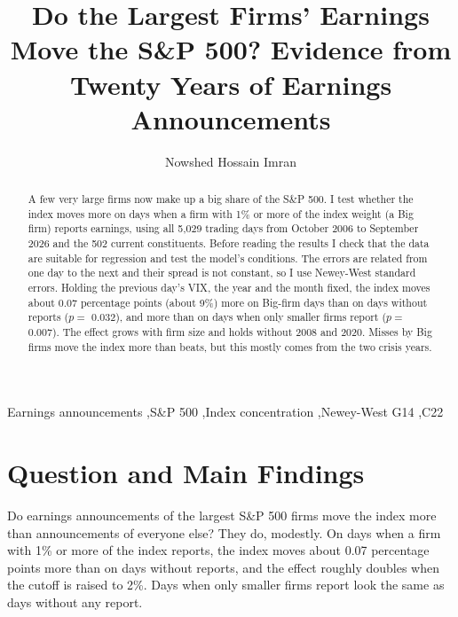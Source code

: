 \documentclass[preprint,letterpaper,11pt,authoryear]{elsarticle}
\begin{document}
\renewcommand{\topfraction}{0.9}
\renewcommand{\textfraction}{0.1}
\renewcommand{\floatpagefraction}{0.8}

\begin{frontmatter}

\title{Do the Largest Firms' Earnings Move the S\&P 500? Evidence from Twenty Years of Earnings Announcements}

\author{Nowshed Hossain Imran}

\begin{abstract}
A few very large firms now make up a big share of the S\&P 500. I test whether the index moves more on days when a firm with 1\% or more of the index weight (a Big firm) reports earnings, using all 5,029 trading days from October 2006 to September 2026 and the 502 current constituents. Before reading the results I check that the data are suitable for regression and test the model's conditions. The errors are related from one day to the next and their spread is not constant, so I use Newey-West standard errors. Holding the previous day's VIX, the year and the month fixed, the index moves about 0.07 percentage points (about 9\%) more on Big-firm days than on days without reports ($p =$ 0.032), and more than on days when only smaller firms report ($p =$ 0.007). The effect grows with firm size and holds without 2008 and 2020. Misses by Big firms move the index more than beats, but this mostly comes from the two crisis years.
\end{abstract}

\begin{keyword}
Earnings announcements \sep S\&P 500 \sep Index concentration \sep Newey-West
\JEL G14 \sep C22
\end{keyword}

\end{frontmatter}

\section{Question and Main Findings}

Do earnings announcements of the largest S\&P 500 firms move the index more than announcements of everyone else? They do, modestly. On days when a firm with 1\% or more of the index reports, the index moves about 0.07 percentage points more than on days without reports, and the effect roughly doubles when the cutoff is raised to 2\%. Days when only smaller firms report look the same as days without any report.
\end{document}
